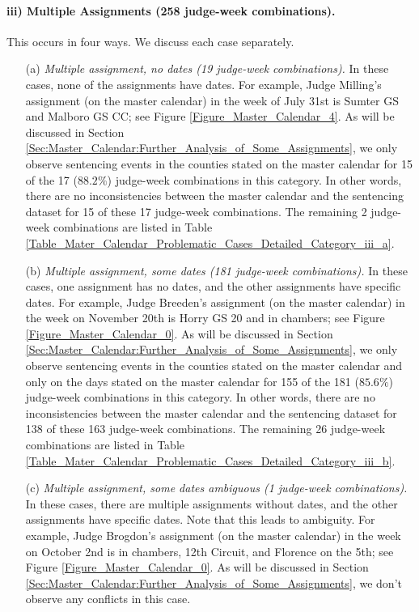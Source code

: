 \documentclass[11pt, oneside]{article}   	%
\theoremstyle{ModifiedStyle}
\begin{document}
		\paragraph{iii) Multiple Assignments (258 judge-week combinations).}
		\label{Category_iii}
		This occurs in four ways. We discuss each case separately.
			\begin{itemize}
				\item[(a)] \emph{Multiple assignment, no dates (19 judge-week combinations).} In these cases, none of the assignments have dates. For example, Judge Milling's assignment (on the master calendar) in the week of July 31st is Sumter GS and Malboro GS CC; see Figure \ref{Figure_Master_Calendar_4}. As will be discussed in Section \ref{Sec:Master_Calendar:Further_Analysis_of_Some_Assignments}, we only observe sentencing events in the counties stated on the master calendar for 15 of the 17 ($88.2\%$) judge-week combinations in this category. In other words, there are no inconsistencies between the master calendar and the sentencing dataset for 15 of these 17 judge-week combinations. The remaining 2 judge-week combinations are listed in Table \ref{Table_Mater_Calendar_Problematic_Cases_Detailed_Category_iii_a}.
				\item[(b)] \emph{Multiple assignment, some dates (181 judge-week combinations).} In these cases, one assignment has no dates, and the other assignments have specific dates. For example, Judge Breeden's assignment (on the master calendar) in the week on November 20th is Horry GS 20 and in chambers; see Figure \ref{Figure_Master_Calendar_0}. As will be discussed in Section \ref{Sec:Master_Calendar:Further_Analysis_of_Some_Assignments}, we only observe sentencing events in the counties stated on the master calendar and only on the days stated on the master calendar for 155 of the 181 ($85.6\%$) judge-week combinations in this category. In other words, there are no inconsistencies between the master calendar and the sentencing dataset for 138 of these 163 judge-week combinations. The remaining 26 judge-week combinations are listed in Table \ref{Table_Mater_Calendar_Problematic_Cases_Detailed_Category_iii_b}.
				\item[(c)] \emph{Multiple assignment, some dates ambiguous (1 judge-week combinations).} In these cases, there are multiple assignments without dates, and the other assignments have specific dates. Note that this leads to ambiguity. For example, Judge Brogdon's assignment (on the master calendar) in the week on October 2nd is in chambers, 12th Circuit, and Florence on the 5th; see Figure \ref{Figure_Master_Calendar_0}. As will be discussed in Section \ref{Sec:Master_Calendar:Further_Analysis_of_Some_Assignments}, we don't observe any conflicts in this case.

\end{itemize}
\end{document}
